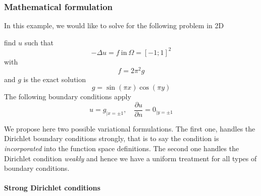 \subsubsection{Mathematical formulation}
\label{sec:math-form-3}
In this example, we would like to solve for the following problem in 2D
\begin{problem}
\label{prob:1}
 find $u$ such that
\begin{equation}
  \label{eq:1}
  -\Delta u = f\ \text{in}\ \Omega = [-1;1]^2
\end{equation}
with
\begin{equation}
  \label{eq:2}
  f= 2 \pi^2  g
\end{equation}
and $g$ is the exact solution
\begin{equation}
  \label{eq:3}
  g=\sin(\pi x) \cos(\pi y)
\end{equation}
The following boundary conditions apply
\begin{equation}
  \label{eq:4}
  u=g_{|x=\pm 1}, \quad \frac{\partial u}{\partial n} = 0_{|y=\pm 1}
\end{equation}
\end{problem}

We propose here two possible variational formulations. The first one,
handles the Dirichlet boundary conditions strongly, that is to say the
condition is \emph{incorporated} into the function space definitions.
The second one handles the Dirichlet condition \emph{weakly} and hence
we have a uniform treatment for all types of boundary conditions.



\paragraph{Strong Dirichlet conditions}
\label{sec:strong-dirichl-cond}

